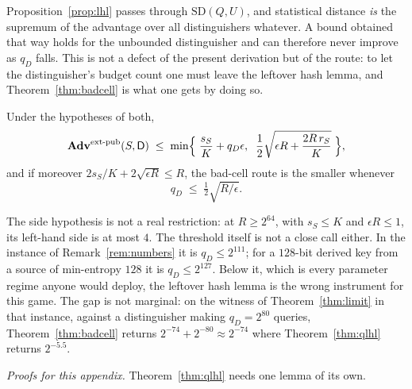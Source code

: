 \documentclass{aicr-solution}
\newcommand{\Adv}{\mathbf{Adv}}
\newcommand{\extpub}{\textup{ext-pub}}
\newcommand{\SD}{\mathrm{SD}}
\begin{document}
\begin{remark}\label{rem:qd}
Proposition~\ref{prop:lhl} passes through $\SD(Q,U)$, and statistical distance \emph{is} the
supremum of the advantage over all distinguishers whatever. A bound obtained that way holds for the
unbounded distinguisher and can therefore never improve as $q_D$ falls. This is not a defect of the
present derivation but of the route: to let the distinguisher's budget count one must leave the
leftover hash lemma, and Theorem~\ref{thm:badcell} is what one gets by doing so.
\end{remark}
\begin{corollary}\label{cor:which}
Under the hypotheses of both,
\[
  \Adv^{\extpub}(S,\mathsf{D}) \;\le\;
  \min\Bigl\{\; \frac{s_S}{K} + q_D\epsilon , \;\;
    \frac12\sqrt{\epsilon R + \frac{2R\,r_S}{K}} \;\Bigr\} ,
\]
and if moreover $2s_S/K + 2\sqrt{\epsilon R} \le R$, the bad-cell route is the smaller whenever
\[
  q_D \;\le\; \tfrac12\sqrt{R/\epsilon} .
\]
\end{corollary}

The side hypothesis is not a real restriction: at $R \ge 2^{64}$, with $s_S \le K$ and
$\epsilon R \le 1$, its left-hand side is at most $4$. The threshold itself is not a close call
either. In the instance of Remark~\ref{rem:numbers} it is
$q_D \le 2^{111}$; for a $128$-bit derived key from a source of min-entropy $128$ it is
$q_D \le 2^{127}$. Below it, which is every parameter regime anyone would deploy, the leftover hash
lemma is the wrong instrument for this game. The gap is not marginal: on the witness of Theorem~\ref{thm:limit} in that instance, against a distinguisher making
$q_D = 2^{80}$ queries, Theorem~\ref{thm:badcell} returns $2^{-74} + 2^{-80} \approx 2^{-74}$ where
Theorem~\ref{thm:qlhl} returns $2^{-5.5}$.

\medskip\noindent\emph{Proofs for this appendix.} Theorem~\ref{thm:qlhl} needs one lemma of its own.
\end{document}
